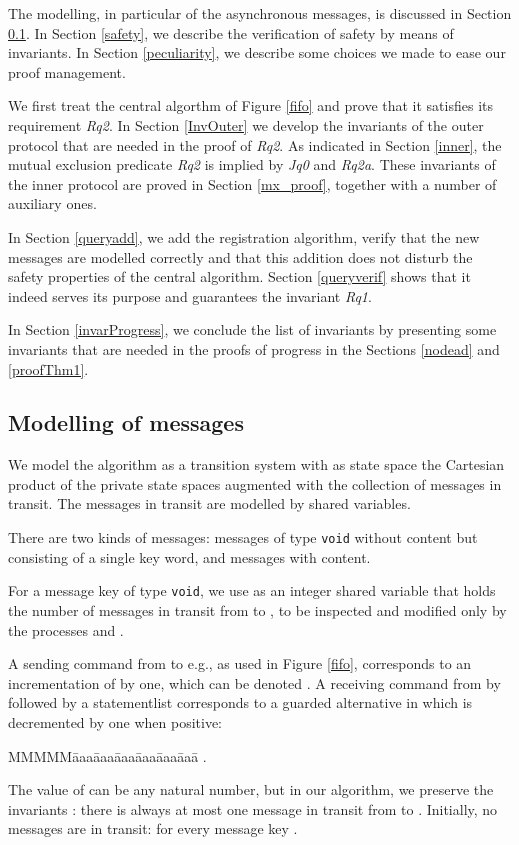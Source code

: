 \documentclass[10pt]{article} \usepackage[english]{babel}
\newenvironment{tab}{\begin{tabbing}
MMMMM\=aaa\=aaa\=aaa\=aaa\=aaa\=aaa\= \kill}{\end{tabbing}}
\def\S #1/{\mbox {\textsl{#1}}}
\def\T #1/{\mbox {\texttt{#1}}}
\begin{document}
The modelling, in particular of the asynchronous messages, is
discussed in Section \ref{channels}. In Section \ref{safety}, we
describe the verification of safety by means of invariants.  In
Section \ref{peculiarity}, we describe some choices we made to ease
our proof management.

We first treat the central algorthm of Figure \ref{fifo} and prove
that it satisfies its requirement \S Rq2/.  In Section \ref{InvOuter}
we develop the invariants of the outer protocol that are needed in the
proof of \S Rq2/.  As indicated in Section \ref{inner}, the mutual
exclusion predicate \S Rq2/ is implied by \S Jq0/ and \S Rq2a/. These
invariants of the inner protocol are proved in Section \ref{mx_proof},
together with a number of auxiliary ones.

In Section \ref{queryadd}, we add the registration algorithm, verify
that the new messages are modelled correctly and that this addition
does not disturb the safety properties of the central algorithm.
Section \ref{queryverif} shows that it indeed serves its purpose and
guarantees the invariant \S Rq1/.

In Section \ref{invarProgress}, we conclude the list of invariants by
presenting some invariants that are needed in the proofs of progress
in the Sections \ref{nodead} and \ref{proofThm1}.

\subsection{Modelling of messages} \label {channels}

We model the algorithm as a transition system with as state space the
Cartesian product of the private state spaces augmented with the
collection of messages in transit.  The messages in transit are
modelled by shared variables.

There are two kinds of messages: messages of type \T void/ without
content but consisting of a single key word, and messages with content.

For a message key  of type \T void/, we use  as an integer
shared variable that holds the number of messages  in transit from
 to , to be inspected and modified only by the processes  and
.

A sending command  from  to  e.g., as used in Figure
\ref{fifo}, corresponds to an incrementation of  by one, which
can be denoted .  A receiving command 
from  by  followed by a statementlist  corresponds to a
guarded alternative in which  is decremented by one when
positive:
\begin{tab}
\>  .
\end{tab}
The value of  can be any natural number, but in our algorithm,
we preserve the invariants : there is always at most one
message  in transit from  to .  Initially, no messages are in
transit:  for every message key .
\end{document}
